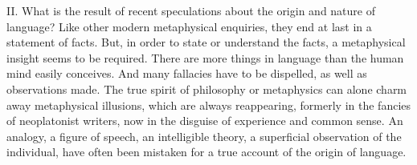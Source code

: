 \documentclass[11pt,letter]{article}
\begin{document}
\par  II. What is the result of recent speculations about the origin and nature of language? Like other modern metaphysical enquiries, they end at last in a statement of facts. But, in order to state or understand the facts, a metaphysical insight seems to be required. There are more things in language than the human mind easily conceives. And many fallacies have to be dispelled, as well as observations made. The true spirit of philosophy or metaphysics can alone charm away metaphysical illusions, which are always reappearing, formerly in the fancies of neoplatonist writers, now in the disguise of experience and common sense. An analogy, a figure of speech, an intelligible theory, a superficial observation of the individual, have often been mistaken for a true account of the origin of language.
\end{document}
